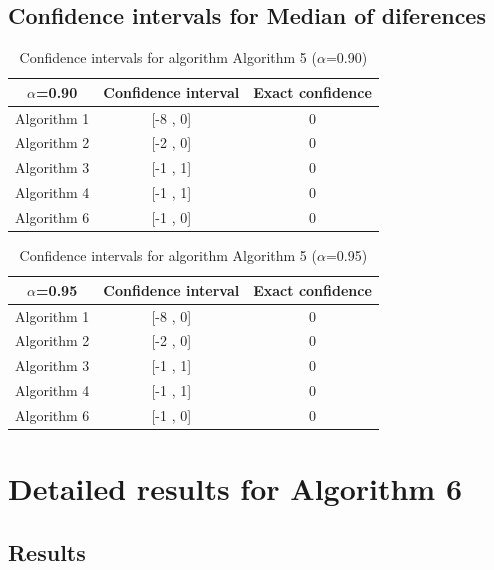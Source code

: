 \documentclass[a4paper,10pt]{article}
\begin{document}
\subsection{Confidence intervals for Median of diferences}

\begin{table}[!htp]
\centering\small
\begin{tabular}{
|c|c|c|}
\hline
 $\alpha$=0.90 & Confidence interval & Exact confidence \\ \hline 
Algorithm 1 & [-8 , 0] & 0\\ \hline 
Algorithm 2 & [-2 , 0] & 0\\ \hline 
Algorithm 3 & [-1 , 1] & 0\\ \hline 
Algorithm 4 & [-1 , 1] & 0\\ \hline 
Algorithm 6 & [-1 , 0] & 0\\ \hline 

\end{tabular}
\caption{Confidence intervals for algorithm Algorithm 5 ($\alpha$=0.90)}
\end{table}
\begin{table}[!htp]
\centering\small
\begin{tabular}{
|c|c|c|}
\hline
 $\alpha$=0.95 & Confidence interval & Exact confidence \\ \hline 
Algorithm 1 & [-8 , 0] & 0\\ \hline 
Algorithm 2 & [-2 , 0] & 0\\ \hline 
Algorithm 3 & [-1 , 1] & 0\\ \hline 
Algorithm 4 & [-1 , 1] & 0\\ \hline 
Algorithm 6 & [-1 , 0] & 0\\ \hline 

\end{tabular}
\caption{Confidence intervals for algorithm Algorithm 5 ($\alpha$=0.95)}
\end{table}

 \clearpage 


\section{Detailed results for Algorithm 6}


\subsection{Results}
\end{document}
